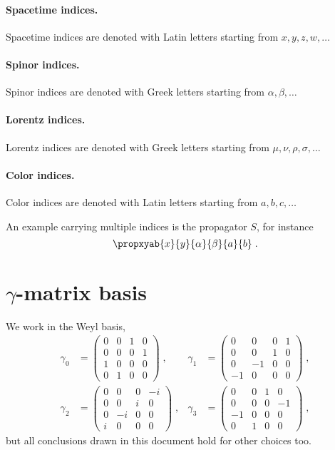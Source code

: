 \paragraph{Spacetime indices.}
Spacetime indices are denoted with Latin letters starting from $x, y, z, w, \ldots$

\paragraph{Spinor indices.}
Spinor indices are denoted with Greek letters starting from $\alpha, \beta, \ldots$

\paragraph{Lorentz indices.}
Lorentz indices are denoted with Greek letters starting from $\mu, \nu, \rho, \sigma, \ldots$

\paragraph{Color indices.}
Color indices are denoted with Latin letters starting from $a, b, c, \ldots$

An example carrying multiple indices is the propagator $S$, for instance
\begin{equation}
\propxyab{x}{y}{\alpha}{\beta}{a}{b} \;.
\end{equation}


\section{\texorpdfstring{$\gamma$}{Gamma}-matrix basis}

We work in the Weyl basis,
\begin{align} \label{eq:gamma:weyl:basis}
\gamma_0 &=
\begin{pmatrix}
0 & 0 & 1 & 0 \\
0 & 0 & 0 & 1 \\
1 & 0 & 0 & 0 \\
0 & 1 & 0 & 0
\end{pmatrix} \;,
&
\gamma_1 &=
\begin{pmatrix}
0 & 0 & 0 & 1 \\
0 & 0 & 1 & 0 \\
0 & -1 & 0 & 0 \\
-1 & 0 & 0 & 0
\end{pmatrix} \;, \\
\gamma_2 &=
\begin{pmatrix}
0 & 0 & 0 & -i \\
0 & 0 & i & 0 \\
0 & -i & 0 & 0 \\
i & 0 & 0 & 0
\end{pmatrix} \;,
&
\gamma_3 &=
\begin{pmatrix}
0 & 0 & 1 & 0 \\
0 & 0 & 0 & -1 \\
-1 & 0 & 0 & 0 \\
0 & 1 & 0 & 0
\end{pmatrix} \;,
\end{align}
but all conclusions drawn in this document hold for other choices too.

